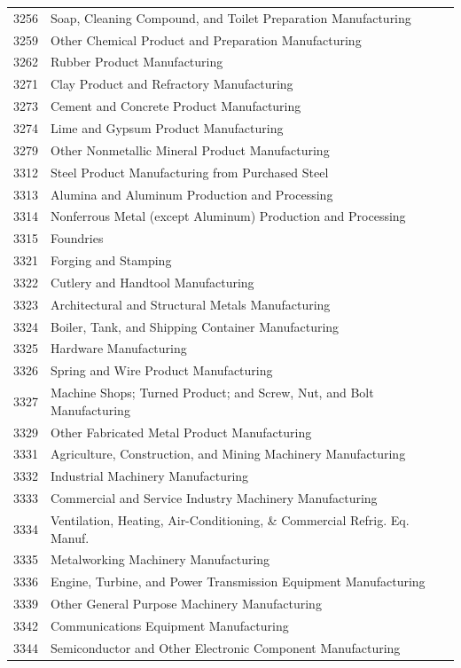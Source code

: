 \begin{spacing}{1}
\begin{longtable}{cl}
3256 &	Soap, Cleaning Compound, and Toilet Preparation Manufacturing \\
3259 &	Other Chemical Product and Preparation Manufacturing \\
3262 &	Rubber Product Manufacturing \\
3271 &	Clay Product and Refractory Manufacturing \\
3273 &	Cement and Concrete Product Manufacturing \\
3274 &	Lime and Gypsum Product Manufacturing \\
3279 &	Other Nonmetallic Mineral Product Manufacturing \\
3312 &	Steel Product Manufacturing from Purchased Steel \\
3313 &	Alumina and Aluminum Production and Processing \\
3314 &	Nonferrous Metal (except Aluminum) Production and Processing \\
3315 &	Foundries \\
3321 &	Forging and Stamping \\
3322 &	Cutlery and Handtool Manufacturing \\
3323 &	Architectural and Structural Metals Manufacturing \\
3324 &	Boiler, Tank, and Shipping Container Manufacturing \\
3325 &	Hardware Manufacturing \\
3326 &	Spring and Wire Product Manufacturing \\
3327 &	Machine Shops; Turned Product; and Screw, Nut, and Bolt Manufacturing \\
3329 &	Other Fabricated Metal Product Manufacturing \\
3331 &	Agriculture, Construction, and Mining Machinery Manufacturing \\
3332 &	Industrial Machinery Manufacturing \\
3333 &	Commercial and Service Industry Machinery Manufacturing \\
3334 &	Ventilation, Heating, Air-Conditioning, \& Commercial Refrig. Eq. Manuf. \\
3335 &	Metalworking Machinery Manufacturing \\
3336 &	Engine, Turbine, and Power Transmission Equipment Manufacturing \\
3339 &	Other General Purpose Machinery Manufacturing \\
3342 &	Communications Equipment Manufacturing \\
3344 &	Semiconductor and Other Electronic Component Manufacturing \\

\end{longtable}
\end{spacing}
